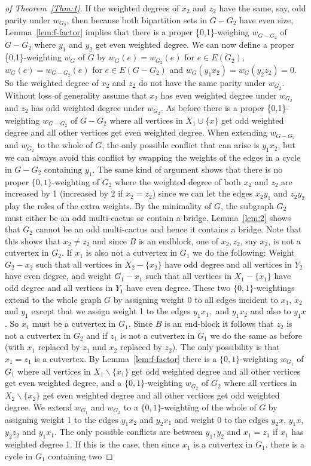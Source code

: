 \documentclass[
final,
 nomarks,
]{dmtcs-episciences}
\theoremstyle{definition}
\begin{document}
\begin{proof}[of Theorem~\ref{Thm:1}]
If the weighted degrees of $x_2$ and $z_2$ have the same, say, odd parity under $w_{G_2}$, then because both bipartition sets in $G-G_2$ have even size, Lemma~\ref{lem:f-factor} implies that there is a proper \{0,1\}-weighing $w_{G-G_2}$ of $G-G_2$ where $y_1$ and $y_2$ get even weighted degree. We can now define a proper \{0,1\}-weighting $w_G$ of $G$ by $w_G(e)=w_{G_2}(e)$ for $e \in E(G_2)$, $w_G(e)=w_{G-G_2}(e)$ for $e \in E(G-G_2)$ and $w_G(y_1x_2)=w_G(y_2z_2)=0$. So the weighted degree of $x_2$ and $z_2$ do not have the same parity under $w_{G_2}$. Without loss of generality assume that $x_2$ has even weighted degree under $w_{G_2}$ and  $z_2$ has odd weighted degree under $w_{G_2}$. As before there is a proper \{0,1\}-weighting $w_{G-G_2}$ of $G-G_2$ where all vertices in $X_1 \cup \{x\}$ get odd weighted degree and all other vertices get even weighted degree. When extending $w_{G-G_2}$ and $w_{G_2}$ to the whole of $G$, the only possible conflict that can arise is $y_1x_2$, but we can always avoid this conflict by swapping the weights of the edges in a cycle in $G-G_2$ containing $y_1$. The same kind of argument shows that there is no proper $\{0,1\}$-weighting of $G_2$ where the weighted degree of both $x_2$ and $z_2$ are increased by 1 (increased by 2 if $x_2=z_2$) since we can let the edges $x_2y_1$ and $z_2y_2$ play the roles of the extra weights. By the minimality of $G$, the subgraph $G_2$ must either be an odd multi-cactus or contain a bridge. Lemma~\ref{lem:2} shows that $G_2$ cannot be an odd multi-cactus and hence it contains a bridge. Note that this shows that $x_2 \neq z_2$ and since $B$ is an endblock, one of $x_2, z_2$, say $x_2$, is not a cutvertex in $G_2$. If $x_1$ is also not a cutvertex in $G_1$ we do the following: Weight $G_2-x_2$ such that all vertices in $X_2 - \{x_2 \}$ have odd degree and all vertices in $Y_2$ have even degree, and weight $G_1-x_1$ such that all vertices in $X_1 - \{x_1 \}$ have odd degree and all vertices in $Y_1$ have even degree. These two $\{0,1\}$-weightings extend to the whole graph $G$ by assigning weight 0 to all edges incident to $x_1$, $x_2$ and $y_1$ except that we assign weight 1 to the edges $y_1x_1,$ and $y_1x_2$ and also to $y_1x$. So $x_1$ must be a cutvertex in $G_1$. Since $B$ is an end-block it follows that $z_2$ is not a cutvertex in $G_2$ and if $z_1$ is not a cutvertex in $G_1$ we do the same as before (with $x_1$ replaced by $z_1$ and $x_2$ replaced by $z_2$). The only possibility is that $x_1=z_1$ is a cutvertex. By Lemma~\ref{lem:f-factor} there is a $\{0,1\}$-weighting $w_{G_1}$ of $G_1$ where all vertices in $X_1\backslash \{x_1\}$ get odd weighted degree and all other vertices get even weighted degree, and a $\{0,1\}$-weighting $w_{G_2}$ of $G_2$ where all vertices in $X_2\backslash \{x_2\}$ get even weighted degree and all other vertices get odd weighted degree. We extend $w_{G_1}$ and $w_{G_2}$ to a $\{0,1\}$-weighting of the whole of $G$ by assigning weight 1 to the edges $y_1x_2$ and $y_2x_1$ and weight 0 to the edges $y_2x$, $y_1x$, $y_2z_2$ and $y_1x_1$. The only possible conflicts are between $y_1, y_2$ and $x_1=z_1$ if $x_1$ has weighted degree 1. If this is the case, then since $x_1$ is a cutvertex in $G_1$, there is a cycle in $G_1$ containing two 
\end{proof}
\end{document}
